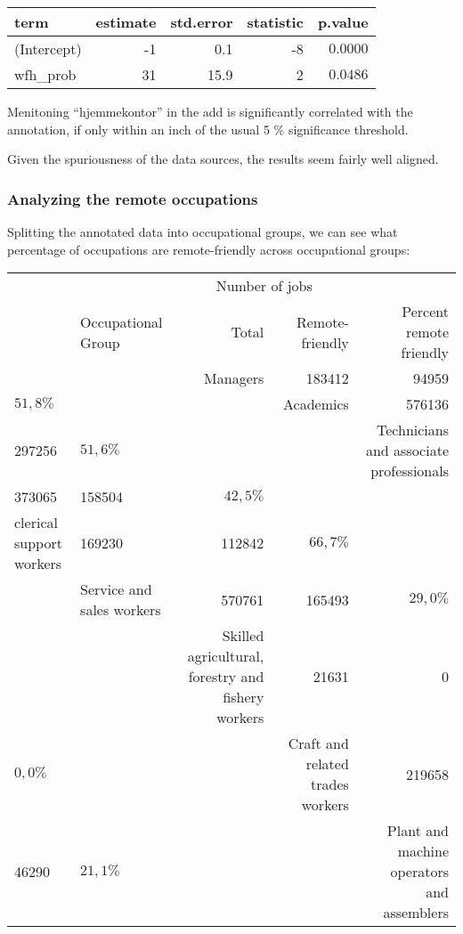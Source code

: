 \documentclass[]{article}
\begin{document}
\captionsetup[table]{labelformat=empty,skip=1pt}
\begin{longtable}{lrrrr}
\toprule
term & estimate & std.error & statistic & p.value \\ 
\midrule
(Intercept) & -1 & 0.1 & -8 & $0.0000$ \\ 
wfh\_prob & 31 & 15.9 & 2 & $0.0486$ \\ 
\bottomrule
\end{longtable}

Menitoning ``hjemmekontor'' in the add is significantly correlated with
the annotation, if only within an inch of the usual 5 \% significance
threshold.

Given the spuriousness of the data sources, the results seem fairly well
aligned.

\hypertarget{analyzing-the-remote-occupations}{%
\subsubsection{Analyzing the remote
occupations}\label{analyzing-the-remote-occupations}}

Splitting the annotated data into occupational groups, we can see what
percentage of occupations are remote-friendly across occupational
groups:

\captionsetup[table]{labelformat=empty,skip=1pt}
\begin{longtable}{llrrr}
\toprule
& & \multicolumn{2}{c}{Number of jobs} & \\ 
 \cmidrule(lr){3-4}
 & Occupational Group & Total & Remote-friendly & Percent remote friendly \\ 
\midrule
 &  & Managers & 183412 & 94959 \\ 
$51,8\%$ &  &  & Academics & 576136 \\ 
297256 & $51,6\%$ &  &  & Technicians and associate professionals \\ 
373065 & 158504 & $42,5\%$ &  &  \\ 
clerical support workers & 169230 & 112842 & $66,7\%$ &  \\ 
 & Service and sales workers & 570761 & 165493 & $29,0\%$ \\ 
 &  & Skilled agricultural, forestry and fishery workers & 21631 & 0 \\ 
$0,0\%$ &  &  & Craft and related trades workers & 219658 \\ 
46290 & $21,1\%$ &  &  & Plant and machine operators and assemblers \\ 
\bottomrule
\end{longtable}
\end{document}
